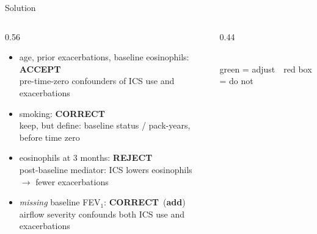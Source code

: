 \documentclass[aspectratio=169]{beamer}
\newcommand{\vaccept}{\textcolor{good}{\textbf{ACCEPT}}}
\newcommand{\vcorrect}{\textcolor{accent}{\textbf{CORRECT}}}
\newcommand{\vreject}{\textcolor{brick}{\textbf{REJECT}}}
\begin{document}
\begin{frame}{Solution}
  \scriptsize
  \begin{columns}[T]
    \begin{column}{0.56\textwidth}
      \begin{itemize}
        \item age, prior exacerbations, baseline eosinophils: \vaccept\\
          {\scriptsize pre-time-zero confounders of ICS use and exacerbations}
        \item smoking: \vcorrect\\
          {\scriptsize keep, but define: baseline status / pack-years, before time zero}
        \item eosinophils at 3 months: \vreject\\
          {\scriptsize post-baseline mediator: ICS lowers eosinophils $\to$ fewer exacerbations}
        \item \emph{missing} baseline FEV$_1$: \vcorrect\ (\textbf{add})\\
          {\scriptsize airflow severity confounds both ICS use and exacerbations}
      \end{itemize}
    \end{column}
    \begin{column}{0.44\textwidth}
      \centering
      \\[0.4em]
      {\scriptsize\textcolor{good}{green = adjust}\ \ \textcolor{brick}{red box = do not}}
    \end{column}
  \end{columns}
  \vspace{0.15em}

\end{frame}
\end{document}
